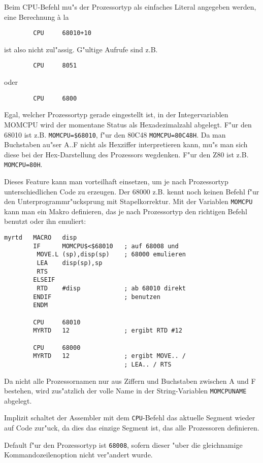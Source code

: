 \documentclass[12pt,a4paper,twoside]{report}
\newcommand{\tty}[1]{{\tt #1}}
\begin{document}
Beim CPU-Befehl mu"s der Prozessortyp als einfaches Literal
angegeben werden, eine Berechnung \`a la
\begin{verbatim}
        CPU     68010+10
\end{verbatim}
ist also nicht zul"assig.  G"ultige Aufrufe sind z.B.
\begin{verbatim}
        CPU     8051
\end{verbatim}
oder
\begin{verbatim}
        CPU     6800
\end{verbatim}
Egal, welcher Prozessortyp gerade eingestellt ist, in der
Integervariablen MOMCPU wird der momentane Status als Hexadezimalzahl
abgelegt.  F"ur den 68010 ist z.B. \tty{MOMCPU=\$68010}, f"ur den 80C48
\tty{MOMCPU=80C48H}.  Da man Buchstaben au"ser A..F nicht als Hexziffer
interpretieren kann, mu"s man sich diese bei der Hex-Darstellung
des Prozessors wegdenken. F"ur den Z80 ist z.B. \tty{MOMCPU=80H}.
\par
Dieses Feature kann
man vorteilhaft einsetzen, um je nach Prozessortyp unterschiedlichen
Code zu erzeugen.  Der 68000 z.B. kennt noch keinen Befehl f"ur den
Unterprogrammr"ucksprung mit Stapelkorrektur.  Mit der Variablen
\tty{MOMCPU} kann man ein Makro definieren, das je nach Prozessortyp den
richtigen Befehl benutzt oder ihn emuliert:
\begin{verbatim}
myrtd   MACRO   disp
        IF      MOMCPU$<$68010   ; auf 68008 und
         MOVE.L (sp),disp(sp)    ; 68000 emulieren
         LEA    disp(sp),sp
         RTS
        ELSEIF
         RTD    #disp            ; ab 68010 direkt
        ENDIF                    ; benutzen
        ENDM

        CPU     68010
        MYRTD   12               ; ergibt RTD #12

        CPU     68000
        MYRTD   12               ; ergibt MOVE.. /
                                 ; LEA.. / RTS
\end{verbatim}
Da nicht alle Prozessornamen nur aus Ziffern und Buchstaben zwischen
A und F bestehen, wird zus"atzlich der volle Name in der
String-Variablen \tty{MOMCPUNAME} abgelegt.
\par
Implizit schaltet der Assembler mit dem \tty{CPU}-Befehl das aktuelle Segment
wieder auf Code zur"uck, da dies das einzige Segment ist, das alle
Prozessoren definieren.
\par
Default f"ur den Prozessortyp ist \tty{68008}, sofern dieser "uber die
gleichnamige Kommandozeilenoption nicht ver"andert wurde.
\end{document}
